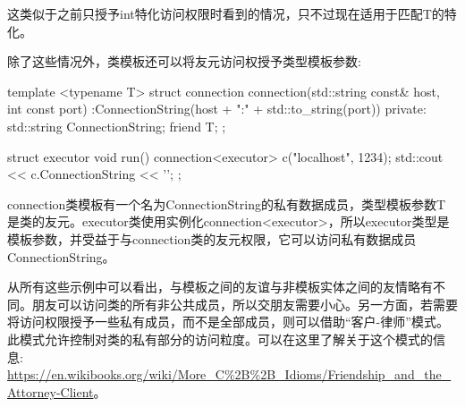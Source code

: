这类似于之前只授予int特化访问权限时看到的情况，只不过现在适用于匹配T的特化。

除了这些情况外，类模板还可以将友元访问权授予类型模板参数:

\begin{cpp}
template <typename T>
struct connection
{
	connection(std::string const& host, int const port)
		:ConnectionString(host + ":" + std::to_string(port))
	{}
private:
	std::string ConnectionString;
	friend T;
};

struct executor
{
	void run()
	{
		connection<executor> c("localhost", 1234);
		std::cout << c.ConnectionString << '\n';
	}
};
\end{cpp}

connection类模板有一个名为ConnectionString的私有数据成员，类型模板参数T是类的友元。executor类使用实例化connection<executor>，所以executor类型是模板参数，并受益于与connection类的友元权限，它可以访问私有数据成员ConnectionString。
 
从所有这些示例中可以看出，与模板之间的友谊与非模板实体之间的友情略有不同。朋友可以访问类的所有非公共成员，所以交朋友需要小心。另一方面，若需要将访问权限授予一些私有成员，而不是全部成员，则可以借助“客户-律师”模式。此模式允许控制对类的私有部分的访问粒度。可以在这里了解关于这个模式的信息: \url{https://en.wikibooks.org/wiki/More_C%2B%2B_Idioms/Friendship_and_the_Attorney-Client}。


